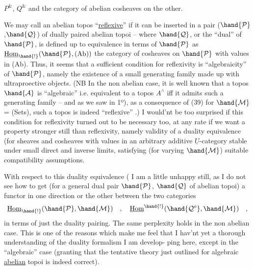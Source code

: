 
$P^{\&}$, $Q^{\&}$ and the category of abelian cosheaves on the other.

We may call an abelian topos ``\uline{reflexive}'' if it can be inserted in a
pair ($\hand{\mathcal{P}}$,$\hand{\mathcal{Q}}$) of dually paired  abelian topoi -- where $\hand{\mathcal{Q}}$, or the
``dual'' of $\hand{\mathcal{P}}$, is defined up to equivalence in terms of $\hand{\mathcal{P}}$ as $\underline{\text{Hom}}_{\hand{!}}(\hand{\mathcal{P}},(\text{Ab}))$\hand{,}
the category of cosheaves on $\hand{\mathcal{P}}$ with values in (Ab). Thus, it seems that
a sufficient condition for reflexivity is ``algebraicity'' of $\hand{\mathcal{P}}$, namely
the existence of a small generating family  made up with ultraproective
objects. (NB In the non abelian case, it is well known that a topos
$\hand{\mathcal{A}}$ is ``algebraic'' i.e. equivalent to a topos $A^{\wedge}$\hand{,} iff it admits such a
generating family -- and as we saw in 1º), as a consequence of (39)
for $\hand{\mathcal{M}}$= (Sets), such a topos is indeed ``reflexive'' .) I would'nt be
too surprised if this condition for reflexivity turned out to
be necessary too, at any rate if we want a property stronger still than
reflexivity, namely validity of a duality equivalence (\hand{***)}for sheaves
and cosheaves with values in an arbitrary additive $\underline{U}$-category stable under
small direct and inverse limits, satisfying (for varying $\hand{\mathcal{M}}$) suitable
compatibility assumptions.

With respect to this duality equivalence (\hand{***)}\hand{,} I am a little unhappy
still, as I do not see how to get (for a general dual pair $\hand{\mathcal{P}}$, $\hand{\mathcal{Q}}$ of
abelian topoi) a functor in one direction or the other between the two
categories
\[ \underline{\text{Hom}}_{\hand{!}}(\hand{\mathcal{P}},\hand{\mathcal{M}}) \quad , \quad \underline{\text{Hom}}^{\hand{!}}(\hand{\mathcal{Q}^{o}},\hand{\mathcal{M}}) \quad , \]
in terms of just the duality pairing. The same perplexity holds in the
non abelian case. This is one of the reasons which make me feel that I
hav'nt yet a thorough understanding of the duality formalism I am develop-%
ping here, except in the ``algebraic'' case (granting  that the tentative
theory just outlined for algebraic \uline{abelian} topoi is indeed correct).

